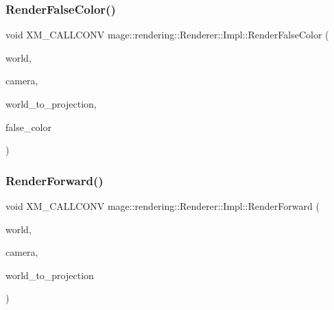 \subsubsection{\texorpdfstring{Render\+False\+Color()}{RenderFalseColor()}}
{\footnotesize\ttfamily void X\+M\+\_\+\+C\+A\+L\+L\+C\+O\+NV mage\+::rendering\+::\+Renderer\+::\+Impl\+::\+Render\+False\+Color (\begin{DoxyParamCaption}\item[{const \mbox{\hyperlink{classmage_1_1rendering_1_1_world}{World}} \&}]{world,  }\item[{const \mbox{\hyperlink{classmage_1_1rendering_1_1_camera}{Camera}} \&}]{camera,  }\item[{F\+X\+M\+M\+A\+T\+R\+IX}]{world\+\_\+to\+\_\+projection,  }\item[{\mbox{\hyperlink{namespacemage_1_1rendering_a6c3d1f4e7a5ae72dc07226e971205534}{False\+Color}}}]{false\+\_\+color }\end{DoxyParamCaption})\hspace{0.3cm}{\ttfamily [private]}}

\mbox{\label{classmage_1_1rendering_1_1_renderer_1_1_impl_a42d47faf6879db3bc00190b9e626eef9}} 
\subsubsection{\texorpdfstring{Render\+Forward()}{RenderForward()}}
{\footnotesize\ttfamily void X\+M\+\_\+\+C\+A\+L\+L\+C\+O\+NV mage\+::rendering\+::\+Renderer\+::\+Impl\+::\+Render\+Forward (\begin{DoxyParamCaption}\item[{const \mbox{\hyperlink{classmage_1_1rendering_1_1_world}{World}} \&}]{world,  }\item[{const \mbox{\hyperlink{classmage_1_1rendering_1_1_camera}{Camera}} \&}]{camera,  }\item[{F\+X\+M\+M\+A\+T\+R\+IX}]{world\+\_\+to\+\_\+projection }\end{DoxyParamCaption})\hspace{0.3cm}{\ttfamily [private]}}

\mbox{\label{classmage_1_1rendering_1_1_renderer_1_1_impl_ae4d71c1e7ec4412983d1728337767b3c}} 
